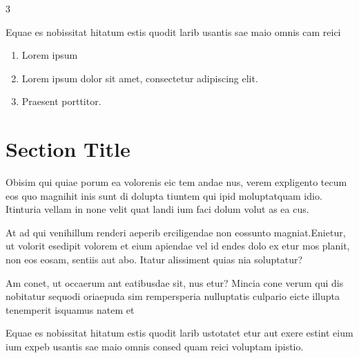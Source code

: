 \documentclass[
]{ImperialPoster}
\begin{document}
\begin{multicols}{3}
	
	Equae es nobissitat hitatum estis quodit larib usantis sae maio omnis cam reici
	
	
	\begin{enumerate}
		\item Lorem ipsum
		\item Lorem ipsum dolor sit amet, consectetur adipiscing elit.
		\item Praesent porttitor.
	\end{enumerate}
	
	\columnbreak %
	
	
	\section{Section Title}
	
	{
		\small %
		Obisim qui quiae porum ea volorenis eic tem andae nus, verem expligento tecum eos quo magnihit inis sunt di dolupta tiuntem qui ipid moluptatquam idio. Itinturia vellam in none velit quat landi ium faci dolum volut as ea cus.

		At ad qui venihillum renderi aeperib erciligendae non eossunto magniat.Enietur, ut volorit esedipit volorem et eium apiendae vel id endes dolo ex etur mos planit, non eos eosam, sentiis aut abo. Itatur alissiment quias nia soluptatur?

		Am conet, ut occaerum ant eatibusdae sit, nus etur? Mincia cone verum qui dis nobitatur sequodi oriaepuda sim rempersperia nulluptatis culpario eicte illupta tenemperit isquamus natem et\par
	}
	
	Equae es nobissitat hitatum estis quodit larib ustotatet \textcolor{ICLBlue}{etur aut exere estint eium ium expeb} usantis sae maio omnis consed quam reici voluptam ipistio.
	
	\vspace{0.31\textheight} %
	

\end{multicols}
\end{document}
